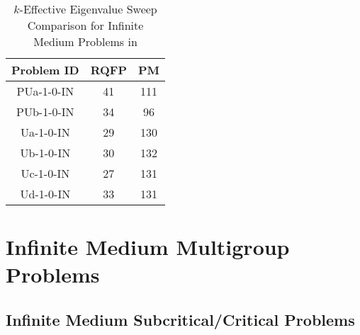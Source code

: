 \begin{table}[]
    \centering
    \caption{$k$-Effective Eigenvalue Sweep Comparison for Infinite Medium Problems in \cite{sood2003analytical}}
\label{table:k}
    \centering
    \begin{tabular}{*3c}
        Problem ID & RQFP & PM \\    
        \midrule
        PUa-1-0-IN & 41 & 111 \\
        PUb-1-0-IN & 34 & 96   \\
	Ua-1-0-IN & 29 & 130\\
	Ub-1-0-IN & 30 & 132 \\
	Uc-1-0-IN & 27 & 131 \\
	Ud-1-0-IN & 33 & 131\\
        \bottomrule
    \end{tabular}
\end{table}

\section{Infinite Medium Multigroup Problems}

\subsection{Infinite Medium Subcritical/Critical Problems}

